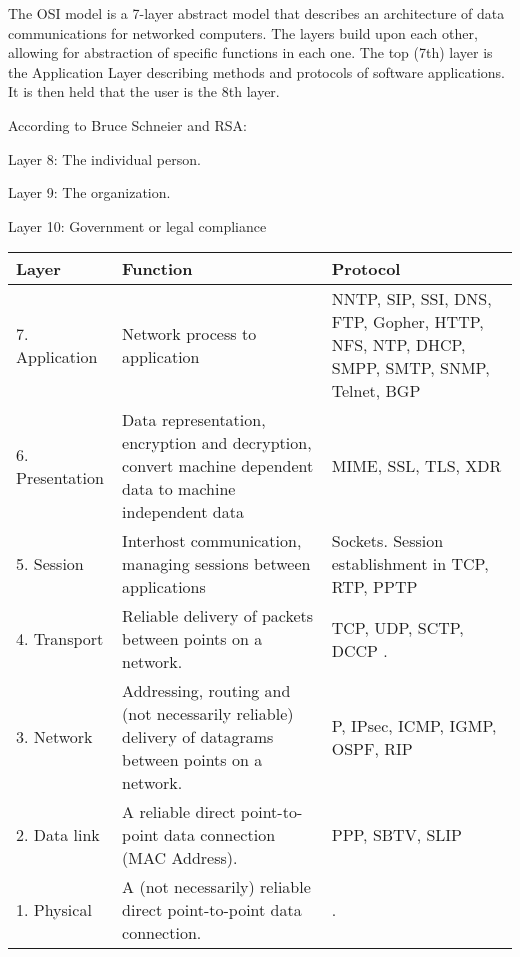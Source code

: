 \documentclass[9pt]{amsart}
\begin{document}
\begin{multicols}{2}
\noindent {\textcolor {blue} {\em MAC Addresses}} 


\noindent {\textcolor {blue} {\em OSI}} 

The OSI model is a 7-layer abstract model that describes an architecture of data communications for networked computers. The layers build upon each other, allowing for abstraction of specific functions in each one. The top (7th) layer is the Application Layer describing methods and protocols of software applications. It is then held that the user is the 8th layer.

According to Bruce Schneier and RSA:

    Layer 8: The individual person.
    
    Layer 9: The organization.
    
    Layer 10: Government or legal compliance
\begin{center}
    \begin{tabular}{| l | p{4.8cm} | p{4.5cm} | }
    \hline
    \textbf {Layer} & \textbf {Function} & \textbf {Protocol} \\ \hline
    7. Application & Network process to application & NNTP, SIP, SSI, DNS, FTP, Gopher, HTTP, NFS, NTP, DHCP, SMPP, SMTP, SNMP, Telnet, BGP \\ \hline
    6. Presentation & Data representation, encryption and decryption, convert machine dependent data to machine independent data & MIME, SSL, TLS, XDR  \\ \hline
    5. Session & Interhost communication, managing sessions between applications & Sockets. Session establishment in TCP, RTP, PPTP \\ \hline
    4. Transport & Reliable delivery of packets between points on a network. & TCP, UDP, SCTP, DCCP . \\ \hline
    3. Network & Addressing, routing and (not necessarily reliable) delivery of datagrams between points on a network. & P, IPsec, ICMP, IGMP, OSPF, RIP \\ \hline
    2. Data link & A reliable direct point-to-point data connection (MAC Address). & PPP, SBTV, SLIP  \\ \hline
    1. Physical & A (not necessarily) reliable direct point-to-point data connection. &  . \\
    \hline
    \end{tabular}
\end{center}


\noindent {\textcolor {blue} {\em Load Balancing}} 


\end{multicols}
\end{document}
